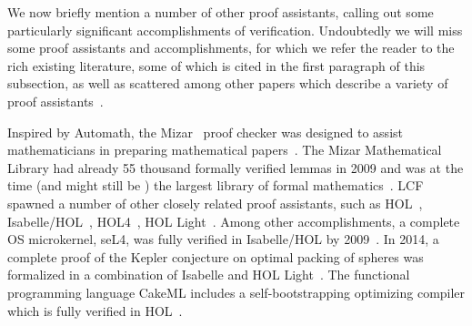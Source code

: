 
We now briefly mention a number of other proof assistants, calling out some particularly significant accomplishments of verification.
Undoubtedly we will miss some proof assistants and accomplishments, for which we refer the reader to the rich existing literature, some of which is cited in the first paragraph of this subsection, as well as scattered among other papers which describe a variety of proof assistants~\cite{Formalizing2009Wiedijk}.

Inspired by Automath, the Mizar~\cite{harrison-mizar,Rudnicki92anoverview,Matuszewski05mizar:the} proof checker was designed to assist mathematicians in preparing mathematical papers~\cite{Rudnicki92anoverview}.
The Mizar Mathematical Library had already 55 thousand formally verified lemmas in 2009 and was at the time (and might still be ) the largest library of formal mathematics~\cite{Formalizing2009Wiedijk}.
LCF~\cite{LCF2000Gordon,gordon1979edinburgh,gordon1978metalanguage} spawned a number of other closely related proof assistants, such as HOL~\cite{Programming2000Barras,LCF2000Gordon}, Isabelle/HOL~\cite{LCF2019Paulson,Isabelle/Isar2002Wenzel,Isabelle,paulson1994isabelle}, HOL4~\cite{slind2008brief}, HOL Light~\cite{harrison1996hol}.
Among other accomplishments, a complete OS microkernel, seL4, was fully verified in Isabelle/HOL by 2009~\cite{seL4SOSP09}.
In 2014, a complete proof of the Kepler conjecture on optimal packing of spheres was formalized in a combination of Isabelle and HOL Light~\cite{flyspeck,flyspeck2014Hales}.
The functional programming language CakeML includes a self-bootstrapping optimizing compiler which is fully verified in HOL~\cite{CakeML}.
